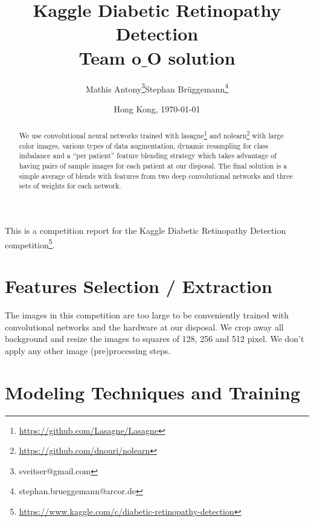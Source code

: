\documentclass[12pt,a4paper]{scrartcl}
\title{Kaggle Diabetic Retinopathy Detection\\Team o$\_$O solution}
\author{Mathis Antony\thanks{sveitser@gmail.com}\quad Stephan Brüggemann\thanks{stephan.brueggemann@arcor.de}}
\date{Hong Kong, \today}
\begin{document}
\maketitle

This is a competition report for the Kaggle Diabetic Retinopathy Detection competition\footnote{\url{https://www.kaggle.com/c/diabetic-retinopathy-detection}}.

\begin{abstract}
We use convolutional neural networks trained with lasagne\footnote{\url{https://github.com/Lasagne/Lasagne}} and nolearn\footnote{\url{https://github.com/dnouri/nolearn}} with large color images, various types of data augmentation, dynamic resampling for class imbalance and a ``per patient'' feature blending strategy which takes advantage of having pairs of sample images for each patient at our disposal. The final solution is a simple average of blends with features from two deep convolutional networks and three sets of weights for each network.
\end{abstract}

\section{Features Selection / Extraction}
The images in this competition are too large to be conveniently trained with convolutional networks and the hardware at our disposal. We crop away all background and resize the images to squares of 128, 256 and 512 pixel. We don't apply any other image (pre)processing steps.
\section{Modeling Techniques and Training}
\end{document}

